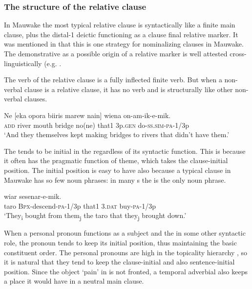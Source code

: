 \subsubsection{The structure of the relative clause} \label{sec:8.3.1.2}

In Mauwake the most typical relative clause is syntactically like a finite main clause, plus the distal-1 deictic  functioning as a clause final relative marker. It was mentioned in  that this is one strategy for nominalizing clauses in Mauwake. The demonstrative as a possible origin of a relative marker is well attested cross-linguistically (e.g. \citealt[342]{Dixon2010b}. 

The verb of the relative clause is a fully inflected finite verb. But when a non-verbal clause is a relative clause, it has no verb and is structurally like other non-verbal clauses. 

\ea%
\label{ex:8:x1943}
\gll Ne  [eka  opora  biiris  marew  nain]  wiena on-am-ik-e-mik.\\
\textsc{add} river  mouth  bridge  no(ne)  that1  3p.\textsc{gen} do-\textsc{ss}.\textsc{sim}-\textsc{pa}-1/3p\\
\glt`And they themselves kept making bridges to rivers that didn't have them.'
\z


The  tends to be initial in the  regardless of its syntactic function. This is because it often has the pragmatic function of theme, which takes the clause-initial position. The initial position is easy to have also because a typical clause in Mauwake has so few noun phrases: in many s the  is the only noun phrase. 

\ea%
\label{ex:8:x1552}
  wiar  sesenar-e-mik.\\
taro  \textsc{Bpx}-descend-\textsc{pa}-1/3p  that1  3.\textsc{dat} buy-\textsc{pa}-1/3p \\
\glt`They\textsubscript{i} bought from them\textsubscript{j} the taro that they\textsubscript{j} brought down.'
\z


When a personal pronoun functions as a subject and the  in some other syntactic role, the pronoun tends to keep its initial position, thus maintaining the basic constituent order. The personal pronouns are high in the topicality hierarchy \citep[166]{Givon1976}, so it is natural that they tend to keep the clause-initial and also sentence-initial position.  Since the object  `pain' in  is not fronted, a temporal adverbial also keeps a place it would have in a neutral main clause. 

